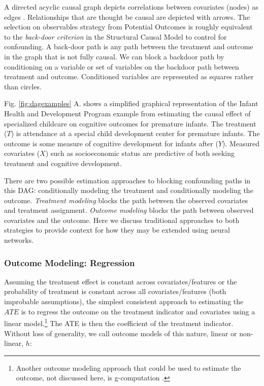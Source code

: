 A directed acyclic causal graph depicts correlations between covariates (nodes) as edges \citep{pearl2009causality}. Relationships that are thought be causal are depicted with arrows. The selection on observables strategy from Potential Outcomes is roughly equivalent to the \textit{back-door criterion} in the Structural Causal Model to control for confounding. A back-door path is any path between the treatment and outcome in the graph that is not fully causal. We can block a backdoor path by conditioning on a variable or set of variables on the backdoor path between treatment and outcome. Conditioned variables are represented as squares rather than circles.

Fig. \ref{fig:dagexamples} A. shows a simplified graphical representation of the Infant Health and Development Program example from \citet{Hill2011} estimating the causal effect of specialized childcare on cognitive outcomes for premature infants. The treatment ($T$) is attendance at a special child development center for premature infants. The outcome is some measure of cognitive development for infants after ($Y$). Measured covariates ($X$) such as socioeconomic status are predictive of both seeking treatment and cognitive development.

There are two possible estimation approaches to blocking confounding paths in this DAG: conditionally modeling the treatment and conditionally modeling the outcome. \textit{Treatment modeling} blocks the path between the observed covariates and treatment assignment. \textit{Outcome modeling} blocks the path between observed covariates and the outcome. Here we discuss traditional approaches to both strategies to provide context for how they may be extended using neural networks.  
\fi


\subsubsection{Outcome Modeling: Regression}

Assuming the treatment effect is constant across covariates/features or the probability of treatment is constant across all covariates/features (both improbable assumptions), the simplest consistent approach to estimating the $ATE$ is to regress the outcome on the treatment indicator and covariates using a linear model.\footnote{Another outcome modeling approach that could be used to estimate the outcome, not discussed here, is g-computation \citep{robins1986new,hernancausal2020}.} The ATE is then the coefficient of the treatment indicator. Without loss of generality, we call outcome models of this nature, linear or non-linear, $h$:

